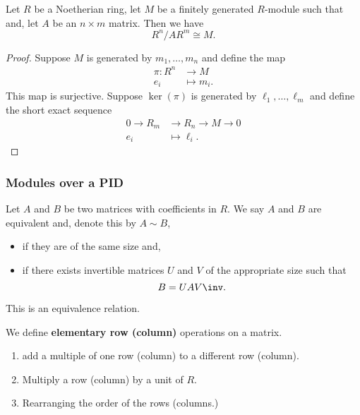 \documentclass[12pt, a4paper]{article}
\begin{document}
\begin{mdcor}
    Let \(R\) be a Noetherian ring, let \(M\) be a finitely generated \(R\)-module such that and, let \(A\) be an \(n\times m\) matrix. Then we have 
    \[R^n/AR^m \cong M.\]
\end{mdcor}

\begin{proof}
    Suppose \(M\) is generated by \(m_1,\ldots,m_n\) and define the map 
    \[\begin{aligned}
        \pi:R^n &\to M\\
        e_i &\mapsto m_i.
    \end{aligned}\]
    This map is surjective. Suppose \(\ker(\pi)\) is generated by \(\ell_1,\ldots,\ell_m\) and define the short exact sequence 
    \[\begin{aligned}
        0\to R_m &\to R_n \to M\to 0 \\
        e_i &\mapsto\ell_i.
    \end{aligned}\]
\end{proof}

\subsubsection{Modules over a PID}

\begin{definition}
    Let \(A\) and \(B\) be two matrices with coefficients in \(R\). We say \(A\) and \(B\) are equivalent and, denote this by \(A \sim B\),
    \begin{itemize}
        \item if they are of the same size and,
        \item if there exists invertible matrices \(U\) and \(V\) of the appropriate size such that 
        \[B=UAV\inv.\]
    \end{itemize}
\end{definition}

\begin{mdremark}
    This is an equivalence relation.
\end{mdremark}

\begin{definition}
    We define \textbf{elementary row (column)} operations on a matrix.
    \begin{enumerate}
        \item add a multiple of one row (column) to a different row (column).
        \item Multiply a row (column) by a unit of \(R\).
        \item Rearranging the order of the rows (columns.)
    \end{enumerate}
\end{definition}
\end{document}
